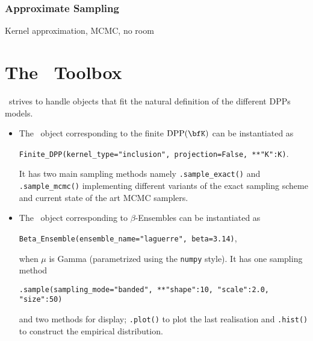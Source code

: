 \documentclass[twoside,11pt]{article}
\begin{document}

    \subsubsection{Approximate Sampling} %
    \label{ssub:approximate_sampling}

      Kernel approximation, MCMC, no room




\section{The \DPPy\ Toolbox} %
\label{sec:the_dppy_toolbox}

  \DPPy\ strives to handle objects that fit the natural definition of the different DPPs models.
  \begin{itemize}
	  \item The \DPPy\ object corresponding to the finite $\DPP(\bfK)$ can be instantiated as
	  \begin{nscenter}
	  	\texttt{Finite_DPP(kernel_type="inclusion", projection=False, **{"K":K})}.
	  \end{nscenter}
		It has two main sampling methods namely \texttt{.sample_exact()} and \texttt{.sample_mcmc()} implementing different variants of the exact sampling scheme and current state of the art MCMC samplers.

		\item The \DPPy\ object corresponding to $\beta$-Ensembles can be instantiated as
		\begin{nscenter}
			\texttt{Beta_Ensemble(ensemble_name="laguerre", beta=3.14)},
		\end{nscenter}
		when $\mu$ is Gamma (parametrized using the \texttt{numpy} style).
		It has one sampling method
		\begin{nscenter}
			\texttt{.sample(sampling_mode="banded", **{"shape":10, "scale":2.0, "size":50})}
		\end{nscenter}
		and two methods for display; \texttt{.plot()} to plot the last realisation and \texttt{.hist()} to construct the empirical distribution.

  \end{itemize}
\end{document}
